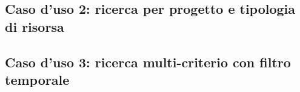 \subsection{Caso d'uso 2: ricerca per progetto e tipologia di risorsa}
\label{subsec:cu2}
%
%
%

\subsection{Caso d'uso 3: ricerca multi-criterio con filtro temporale}
\label{subsec:cu3}
%
%
%



